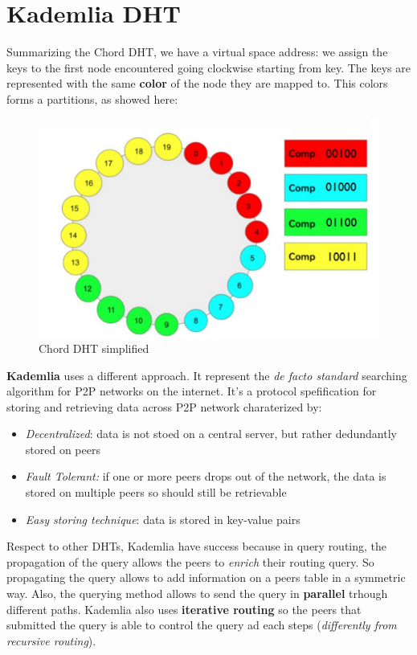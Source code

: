 \documentclass[10pt,a4paper]{report}
\begin{document}
\clearpage

\section{Kademlia DHT}\label{sec:kademlia-dht}
Summarizing the Chord DHT, we have a virtual space address: we assign the keys to the first node encountered going clockwise starting from key. The keys are represented with the same \textbf{color} of the node they are mapped to. This colors forms a partitions, as showed here:
\begin{figure}[h]
	\centering
	\includegraphics[scale=0.50]{images/Pasted image 20230303141647.png}
	\caption{Chord DHT simplified}
	\label{kademlia-dht}
\end{figure}


\textbf{Kademlia} uses a different approach. It represent the \textit{de facto standard} searching algorithm for P2P networks on the internet. It's a protocol spefification for storing and retrieving data across P2P network charaterized by:
\begin{itemize}
	\item 
	\textit{Decentralized}: data is not stoed on a central server, but rather dedundantly stored on peers
	\item 
	\textit{Fault Tolerant:} if one or more peers drops out of the network, the data is stored on multiple peers so should still be retrievable
	\item 
	\textit{Easy storing technique}: data is stored in key-value pairs
\end{itemize}

Respect to other DHTs, Kademlia have success because in query routing, the propagation of the query allows the peers to \textit{enrich} their routing query. So propagating the query allows to add information on a peers table in a symmetric way. Also, the querying method allows to send the query in \textbf{parallel} trhough different paths.
Kademlia also uses \textbf{iterative routing} so the peers that submitted the query is able to control the query ad each steps (\textit{differently from recursive routing}).
\end{document}
